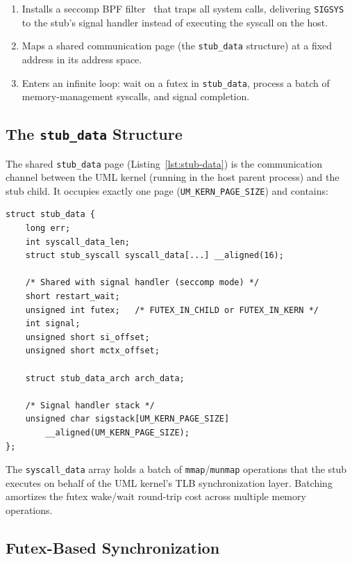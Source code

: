 \begin{enumerate}[leftmargin=2em]
\item Installs a seccomp BPF filter~\cite{seccomp-bpf} that traps all system
  calls, delivering \texttt{SIGSYS} to the stub's signal handler instead of
  executing the syscall on the host.
\item Maps a shared communication page (the \texttt{stub\_data} structure) at a
  fixed address in its address space.
\item Enters an infinite loop: wait on a futex in \texttt{stub\_data},
  process a batch of memory-management syscalls, and signal completion.
\end{enumerate}

\subsection{The \texttt{stub\_data} Structure}

The shared \texttt{stub\_data} page (Listing~\ref{lst:stub-data}) is the
communication channel between the UML kernel (running in the host parent
process) and the stub child.  It occupies exactly one page
(\texttt{UM\_KERN\_PAGE\_SIZE}) and contains:

\begin{lstlisting}[language=KernelC, caption={The \texttt{stub\_data}
  structure (from \texttt{arch/um/include/shared/skas/stub-data.h}).},
  label={lst:stub-data}]
struct stub_data {
    long err;
    int syscall_data_len;
    struct stub_syscall syscall_data[...] __aligned(16);

    /* Shared with signal handler (seccomp mode) */
    short restart_wait;
    unsigned int futex;   /* FUTEX_IN_CHILD or FUTEX_IN_KERN */
    int signal;
    unsigned short si_offset;
    unsigned short mctx_offset;

    struct stub_data_arch arch_data;

    /* Signal handler stack */
    unsigned char sigstack[UM_KERN_PAGE_SIZE]
        __aligned(UM_KERN_PAGE_SIZE);
};
\end{lstlisting}

The \texttt{syscall\_data} array holds a batch of \texttt{mmap}/\texttt{munmap}
operations that the stub executes on behalf of the UML kernel's TLB
synchronization layer.  Batching amortizes the futex wake/wait round-trip cost
across multiple memory operations.

\subsection{Futex-Based Synchronization}

